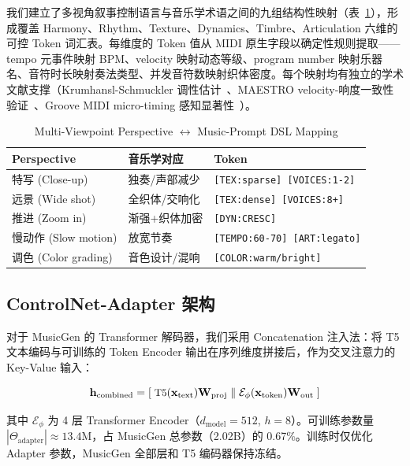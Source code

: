 \documentclass[11pt,twocolumn]{article}
\begin{document}
我们建立了多视角叙事控制语言与音乐学术语之间的九组结构性映射（表~\ref{tab:mapping}），形成覆盖 Harmony、Rhythm、Texture、Dynamics、Timbre、Articulation 六维的可控 Token 词汇表。每维度的 Token 值从 MIDI 原生字段以确定性规则提取——tempo 元事件映射 BPM、velocity 映射动态等级、program number 映射乐器名、音符时长映射奏法类型、并发音符数映射织体密度。每个映射均有独立的学术文献支撑（Krumhansl-Schmuckler 调性估计~\cite{krumhansl}、MAESTRO velocity-响度一致性验证~\cite{maestro}、Groove MIDI micro-timing 感知显著性~\cite{groove}）。

\begin{table}[t]
\centering\footnotesize
\setlength{\tabcolsep}{3pt}%
\caption{Multi-Viewpoint Perspective $\leftrightarrow$ Music-Prompt DSL Mapping}
\label{tab:mapping}
\begin{tabularx}{\columnwidth}{@{}l >{\raggedright\arraybackslash}X >{\raggedright\arraybackslash}X@{}}
\toprule
\textbf{Perspective} & \textbf{音乐学对应} & \textbf{Token} \\
\midrule
特写 (Close-up) & 独奏/声部减少 & \texttt{[TEX:sparse] [VOICES:1-2]} \\
远景 (Wide shot) & 全织体/交响化 & \texttt{[TEX:dense] [VOICES:8+]} \\
推进 (Zoom in) & 渐强+织体加密 & \texttt{[DYN:CRESC]} \\
慢动作 (Slow motion) & 放宽节奏 & \texttt{[TEMPO:60-70] [ART:legato]} \\
调色 (Color grading) & 音色设计/混响 & \texttt{[COLOR:warm/bright]} \\
\bottomrule
\end{tabularx}
\end{table}

\subsection{ControlNet-Adapter 架构}

对于 MusicGen 的 Transformer 解码器，我们采用 Concatenation 注入法：将 T5 文本编码与可训练的 Token Encoder 输出在序列维度拼接后，作为交叉注意力的 Key-Value 输入：

\begin{equation}\small
\mathbf{h}_{\text{combined}} = [\;\text{T5}(\mathbf{x}_{\text{text}})\mathbf{W}_{\text{proj}}\;\|\;
\mathcal{E}_{\phi}(\mathbf{x}_{\text{token}})\mathbf{W}_{\text{out}}\;]
\end{equation}

其中 $\mathcal{E}_{\phi}$ 为 4 层 Transformer Encoder（$d_{\text{model}}=512$, $h=8$）。可训练参数量 $|\Theta_{\text{adapter}}| \approx 13.4$M，占 MusicGen 总参数（2.02B）的 0.67\%。训练时仅优化 Adapter 参数，MusicGen 全部层和 T5 编码器保持冻结。
\end{document}
